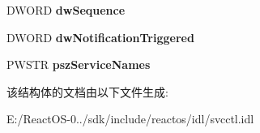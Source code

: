 \begin{DoxyCompactItemize}
D\+W\+O\+RD {\bfseries dw\+Sequence}
\item 
\mbox{\label{struct___s_e_r_v_i_c_e___n_o_t_i_f_y___s_t_a_t_u_s___c_h_a_n_g_e___p_a_r_a_m_s__2_aa88ba83f174e77180df12302a79c58dd}} 
D\+W\+O\+RD {\bfseries dw\+Notification\+Triggered}
\item 
\mbox{\label{struct___s_e_r_v_i_c_e___n_o_t_i_f_y___s_t_a_t_u_s___c_h_a_n_g_e___p_a_r_a_m_s__2_a656eae6108ea68a38f7693802987f74e}} 
P\+W\+S\+TR {\bfseries psz\+Service\+Names}
\end{DoxyCompactItemize}


该结构体的文档由以下文件生成\+:\begin{DoxyCompactItemize}
\item 
E\+:/\+React\+O\+S-\/0../sdk/include/reactos/idl/svcctl.\+idl\end{DoxyCompactItemize}
